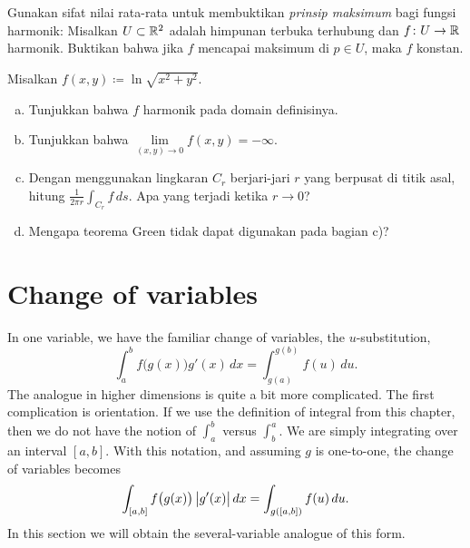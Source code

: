\begin{exercise}
Gunakan sifat nilai rata-rata untuk membuktikan
\emph{prinsip maksimum}
bagi fungsi harmonik:
Misalkan $U \subset {\mathbb{R}}^2$ adalah himpunan terbuka terhubung dan
$f \colon U \to {\mathbb{R}}$ harmonik. Buktikan bahwa jika $f$ mencapai maksimum di
$p \in U$, maka $f$ konstan.
\end{exercise}

\begin{exercise}
Misalkan $f(x,y) \coloneqq \ln \sqrt{x^2+y^2}$.
\begin{enumerate}[a)]
\item
Tunjukkan bahwa $f$ harmonik pada domain definisinya.
\item
Tunjukkan bahwa $\lim\limits_{(x,y) \to 0} f(x,y) = -\infty$.
\item
Dengan menggunakan lingkaran $C_r$ berjari-jari
$r$ yang berpusat di titik asal, hitung $\frac{1}{2\pi r} \int_{C_r} f \, ds$.
Apa yang terjadi ketika $r \to 0$?
\item
Mengapa teorema Green tidak dapat digunakan pada bagian c)?
\end{enumerate}
\end{exercise}





\sectionnewpage
\section{Change of variables}
\label{sec:mvchangeofvars}


In one variable, we have the familiar change of variables, the
$u$-substitution,
\begin{equation*}
\int_a^b f\bigl(g(x)\bigr) g'(x)\, dx = 
\int_{g(a)}^{g(b)} f(u) \, du .
\end{equation*}
The analogue in higher dimensions is quite
a bit more complicated.  The first complication is orientation.  If we use
the definition of integral from this chapter, then we do not have the notion
of $\int_a^b$ versus $\int_b^a$.  We are simply integrating over an
interval $[a,b]$.  With this notation, and assuming $g$ is one-to-one,
the change of variables becomes
\begin{equation*}
\int_{[a,b]} f\bigl(g(x)\bigr) \, \bigl\lvert {g'(x)} \bigr\rvert\, dx = 
\int_{g([a,b])} f(u) \, du .
\end{equation*}
In this section we will obtain the several-variable analogue of this form.

